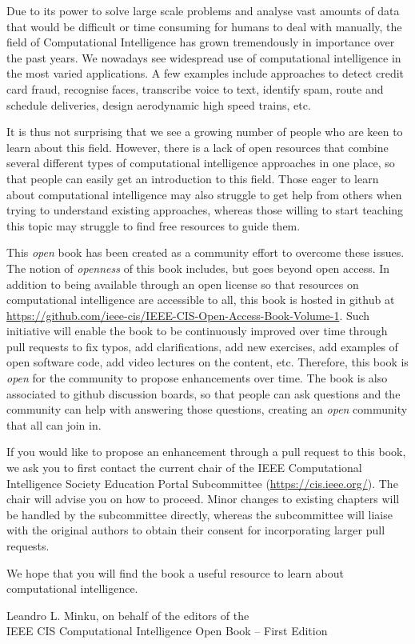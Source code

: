 %
%

\preface

Due to its power to solve large scale problems and analyse vast amounts of data that would be difficult or time consuming for humans to deal with manually, the field of Computational Intelligence has grown tremendously in importance over the past years. We nowadays see widespread use of computational intelligence in the most varied applications. A few examples include approaches to detect credit card fraud, recognise faces, transcribe voice to text, identify spam, route and schedule deliveries, design aerodynamic high speed trains, etc. 

It is thus not surprising that we see a growing number of people who are keen to learn about this field. However, there is a lack of open resources that combine several different types of computational intelligence approaches in one place, so that people can easily get an introduction to this field. Those eager to learn about computational intelligence may also struggle to get help from others when trying to understand existing approaches, whereas those willing to start teaching this topic may struggle to find free resources to guide them. 

This \textit{open} book has been created as a community effort to overcome these issues. The notion of \textit{openness} of this book includes, but goes beyond open access. In addition to being available through an open license so that resources on computational intelligence are accessible to all, this book is hosted in github at \url{https://github.com/ieee-cis/IEEE-CIS-Open-Access-Book-Volume-1}. Such initiative will enable the book to be continuously improved over time through pull requests to fix typos, add clarifications, add new exercises, add examples of open software code, add video lectures on the content, etc. Therefore, this book is \textit{open} for the community to propose enhancements over time. The book is also associated to github discussion boards, so that people can ask questions and the community can help with answering those questions, creating an \textit{open} community that all can join in. 

If you would like to propose an enhancement through a pull request to this book, we ask you to first contact the current chair of the IEEE Computational Intelligence Society Education Portal Subcommittee (\url{https://cis.ieee.org/}). The chair will advise you on how to proceed. Minor changes to existing chapters will be handled by the subcommittee directly, whereas the subcommittee will liaise with the original authors to obtain their consent for incorporating larger pull requests. 

We hope that you will find the book a useful resource to learn about computational intelligence.

\vspace{\baselineskip}
\begin{flushright}\noindent
Leandro L. Minku, on behalf of the editors of the\\
IEEE CIS Computational Intelligence Open Book -- First Edition 
\end{flushright}


